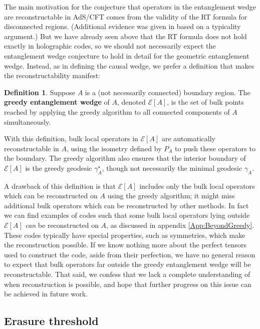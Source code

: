 \documentclass[12pt]{article}
\theoremstyle{plain}
\theoremstyle{plain}
\theoremstyle{plain}
\theoremstyle{plain}
\theoremstyle{result}
\theoremstyle{remark}
\theoremstyle{conjecture}
\theoremstyle{observation}
\theoremstyle{definition}
\theoremstyle{corollary}
\theoremstyle{definition}
\theoremstyle{definition}
\newtheorem{definition}{Definition}
\theoremstyle{assumption}
\theoremstyle{definition}
\theoremstyle{problem}
\theoremstyle{fact}
\newcommand{\EA}{\mathcal{E}[A]}
\begin{document}
The main motivation for the conjecture that operators in the entanglement wedge are reconstructable in AdS/CFT comes from the validity of the RT formula for disconnected regions. (Additional evidence was given in \cite{Almheiri14} based on a typicality argument.)  But we have already seen above that the RT formula does not hold exactly in holographic codes, so we should not necessarily expect the entanglement wedge conjecture to hold in detail for the geometric entanglement wedge. Instead, as in defining the causal wedge, we prefer a definition that makes  the reconstructability manifest:

\begin{definition}
Suppose $A$ is a (not necessarily connected) boundary region.  The \textbf{greedy entanglement wedge} of  $A$, denoted $\EA$, is the set of bulk points reached by applying the greedy algorithm to all connected components of $A$ simultaneously.
\end{definition}
\noindent
With this definition, bulk local operators in $\EA$ are automatically reconstructable in $A$, using the isometry defined by $P_A$ to push these operators to the boundary. The greedy algorithm also ensures that the interior boundary of $\EA$ is the greedy geodesic $\gamma_A^\star$, though not necessarily the minimal geodesic $\gamma_A$. 

A drawback of this definition is that $\EA$ includes only the bulk local operators which can be reconstructed on $A$ using the greedy algorithm; it might miss additional bulk operators which can be reconstructed by other methods. 
In fact we can find examples of codes such that some bulk local operators lying outside $\EA$ \textit{can} be reconstructed on $A$, as discussed in appendix \ref{App:BeyondGreedy}. 
These codes typically have special properties, such as symmetries, which make the reconstruction possible. 
If we know nothing more about the perfect tensors used to construct the code, aside from their perfection, we have no general reason to expect that bulk operators far outside the greedy entanglement wedge will be reconstructable.
That said, we confess that we lack a complete understanding of when reconstruction is possible, and hope that further progress on this issue can be achieved in future work. 

\subsection{Erasure threshold}
\end{document}
